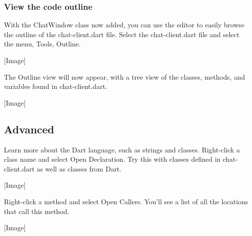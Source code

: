 \subsubsection{View the code outline}

With the ChatWindow class now added, you can use the editor to easily browse the outline of the chat-client.dart file.
Select the chat-client.dart file and select the menu, Tools, Outline.

[Image]

The Outline view will now appear, with a tree view of the classes, methods, and variables found in chat-client.dart.

[Image]

\subsection{Advanced}

Learn more about the Dart language, such as strings and classes. Right-click a class name and select Open Declaration. Try this with classes defined in chat-client.dart as well as classes from Dart.

[Image]

Right-click a method and select Open Callers. You’ll see a list of all the locations that call this method.

[Image]

